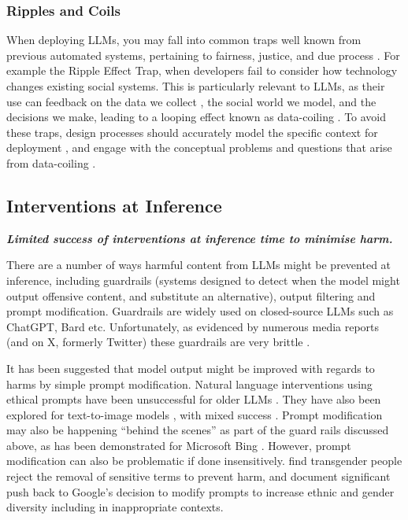 \subsubsection{Ripples and Coils}
When deploying LLMs, you may fall into common traps well known from previous automated systems, pertaining to fairness, justice, and due process \cite{selbst_fairness_2019}. For example the Ripple Effect Trap, when developers fail to consider how technology changes existing social systems. This is particularly relevant to LLMs, as their use can feedback on the data we collect \citep{pan_risk_2023}, the social world we model, and the decisions we make, leading to a looping effect known as data-coiling \cite{beer_problem_2022}.
To avoid these traps, design processes should accurately model the specific context for deployment \cite{selbst_fairness_2019}, and engage with the conceptual problems and questions that arise from data-coiling \cite{beer_problem_2022}.

\subsection{Interventions at Inference}\label{subsec:inf}
\noindent\textbf{\textit{Limited success of interventions at inference time to minimise harm.}}
\newline 

\noindent There are a number of ways harmful content from LLMs might be prevented at inference, including guardrails (systems designed to detect when the model might output offensive content, and substitute an alternative), output filtering and prompt modification. Guardrails are widely used on closed-source LLMs such as ChatGPT, Bard etc. Unfortunately, as evidenced by numerous media reports (and on X, formerly Twitter) these guardrails are very brittle \citep{cuthbertson_chatgpt_2023}.

It has been suggested that model output might be improved with regards to harms by simple prompt modification. Natural language interventions using ethical prompts have been unsuccessful for older LLMs \citep{zhao_ethical-advice_2021}. They have also been explored for text-to-image models \citep{bansal_how_2022}, with mixed success %
\citep{shin_can_2024}. Prompt modification may also be happening ``behind the scenes'' as part of the guard rails discussed above, as has been demonstrated for Microsoft Bing \citep{edwards_ai-powered_2023}. However, prompt modification can also be problematic if done insensitively. \citet{ungless_stereotypes_2023} find transgender people reject the removal of sensitive terms to prevent harm, and \citet{vynck_google_2024} document significant push back to Google's decision to modify prompts to increase ethnic and gender diversity including in inappropriate contexts.

